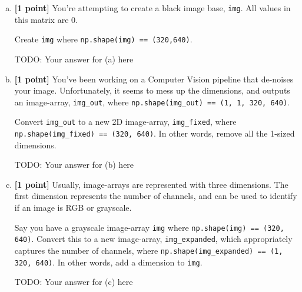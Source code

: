 \begin{enumerate}[(a)]
    \item \textbf{[1 point]} You're attempting to create a black image base, \texttt{img}. All values in this matrix are 0. 
    
    \begin{tcolorbox}[colback=orange!5!white,colframe=orange!75!black]
    Create \texttt{img} where \texttt{np.shape(img) == (320,640)}.
    \end{tcolorbox}
    
    \begin{mdframed}
        TODO: Your answer for (a) here
    \end{mdframed}
    
    \item \textbf{[1 point]} You've been working on a Computer Vision pipeline that de-noises your image. Unfortunately, it seems to mess up the dimensions, and outputs an image-array, \texttt{img\_out}, where \texttt{np.shape(img\_out) == (1, 1, 320, 640)}. 
    
    \begin{tcolorbox}[colback=orange!5!white,colframe=orange!75!black]
    Convert \texttt{img\_out} to a new 2D image-array, \texttt{img\_fixed}, where \texttt{np.shape(img\_fixed) == (320, 640)}. In other words, remove all the 1-sized dimensions.
    \end{tcolorbox}

    \begin{mdframed}
        TODO: Your answer for (b) here
    \end{mdframed}
    
    \item \textbf{[1 point]} Usually, image-arrays are represented with three dimensions. The first dimension represents the number of channels, and can be used to identify if an image is RGB or grayscale. 
    
    \begin{tcolorbox}[colback=orange!5!white,colframe=orange!75!black]
    Say you have a grayscale image-array \texttt{img} where \texttt{np.shape(img) == (320, 640)}. Convert this to a new image-array, \texttt{img\_expanded}, which appropriately captures the number of channels, where \texttt{np.shape(img\_expanded) == (1, 320, 640)}. In other words, add a dimension to \texttt{img}.
    \end{tcolorbox}

    \begin{mdframed}
        TODO: Your answer for (c) here
    \end{mdframed}
    

\end{enumerate}

